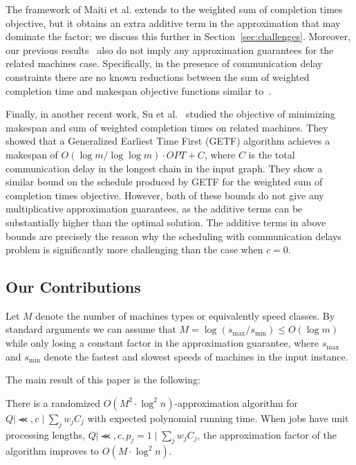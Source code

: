   The framework of Maiti {et al.} extends to the weighted sum of completion times objective, but it obtains 
  an extra additive term in the approximation that may dominate the factor; 
  we discuss this further in Section~\ref{sec:challenges}.
  Moreover, our previous results~\cite{DKRTZ20} also do not imply any approximation guarantees for the related machines case.
  Specifically, in the presence of communication delay constraints there are no known reductions
  between the sum of weighted completion time and makespan objective functions similar to~\cite{UniformlyRelatedMachinesWithPrecedences-ChudakShmoys-JALG99}.
  
  Finally, in another recent work, Su et al.~\cite{weirman} studied the objective of minimizing makespan and sum of weighted completion times on related machines. 
  They showed that a Generalized Earliest Time First (GETF) algorithm achieves a makespan of $O(\log m/\log \log m) \cdot OPT + C$, where $C$ is the total communication delay in the longest chain in the input graph.
  They show a similar bound on the schedule produced by GETF for the weighted sum of completion times objective.
  However, both of these bounds do not give any multiplicative approximation guarantees, as the additive terms can be substantially higher than the optimal solution.
  The additive terms in above bounds are precisely the reason why the scheduling with communication delays problem is significantly more challenging than the case when $c = 0$.
  
  
  
  
  \subsection{Our Contributions}
  
  Let $M$ denote the number of machines types or equivalently speed classes.
  By standard arguments we can assume that $M =\log(s_{\text{max}}/s_{\text{min}})\leq O(\log m)$ while only losing a constant factor in the approximation guarantee, where $s_{\text{max}}$ and $s_{\text{min}}$ denote the fastest and slowest speeds of machines in the input instance.
  
  The main result of this paper is the following:
  
  \begin{theorem} \label{thm:main}
  There is a randomized $O(M^2 \cdot \log^2 n)$-approximation algorithm for $Q \mid \Prec, c \mid \sum_{j} w_j C_j$ with expected polynomial running time. When jobs have unit processing lengths, $Q \mid \Prec, c, p_j = 1 \mid \sum_{j} w_j C_j$, the approximation factor of the algorithm improves to  $O(M \cdot \log^2 n )$.
  \end{theorem}
  
